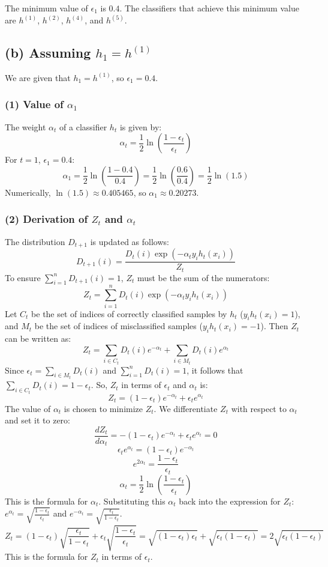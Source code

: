 The minimum value of $\epsilon_1$ is $0.4$.
The classifiers that achieve this minimum value are $h^{(1)}$, $h^{(2)}$, $h^{(4)}$, and $h^{(5)}$.

\subsection*{(b) Assuming $h_1 = h^{(1)}$}
We are given that $h_1 = h^{(1)}$, so $\epsilon_1 = 0.4$.

\subsubsection*{(1) Value of $\alpha_1$}
The weight $\alpha_t$ of a classifier $h_t$ is given by:
$$ \alpha_t = \frac{1}{2} \ln\left(\frac{1-\epsilon_t}{\epsilon_t}\right) $$
For $t=1$, $\epsilon_1 = 0.4$:
$$ \alpha_1 = \frac{1}{2} \ln\left(\frac{1-0.4}{0.4}\right) = \frac{1}{2} \ln\left(\frac{0.6}{0.4}\right) = \frac{1}{2} \ln(1.5) $$
Numerically, $\ln(1.5) \approx 0.405465$, so $\alpha_1 \approx 0.20273$.

\subsubsection*{(2) Derivation of $Z_t$ and $\alpha_t$}
The distribution $D_{t+1}$ is updated as follows:
$$ D_{t+1}(i) = \frac{D_t(i) \exp(-\alpha_t y_i h_t(x_i))}{Z_t} $$
To ensure $\sum_{i=1}^{n} D_{t+1}(i) = 1$, $Z_t$ must be the sum of the numerators:
$$ Z_t = \sum_{i=1}^{n} D_t(i) \exp(-\alpha_t y_i h_t(x_i)) $$
Let $C_t$ be the set of indices of correctly classified samples by $h_t$ ($y_i h_t(x_i)=1$), and $M_t$ be the set of indices of misclassified samples ($y_i h_t(x_i)=-1$).
Then $Z_t$ can be written as:
$$ Z_t = \sum_{i \in C_t} D_t(i) e^{-\alpha_t} + \sum_{i \in M_t} D_t(i) e^{\alpha_t} $$
Since $\epsilon_t = \sum_{i \in M_t} D_t(i)$ and $\sum_{i=1}^n D_t(i) = 1$, it follows that $\sum_{i \in C_t} D_t(i) = 1 - \epsilon_t$.
So, $Z_t$ in terms of $\epsilon_t$ and $\alpha_t$ is:
$$ Z_t = (1-\epsilon_t)e^{-\alpha_t} + \epsilon_t e^{\alpha_t} $$
The value of $\alpha_t$ is chosen to minimize $Z_t$. We differentiate $Z_t$ with respect to $\alpha_t$ and set it to zero:
$$ \frac{dZ_t}{d\alpha_t} = -(1-\epsilon_t)e^{-\alpha_t} + \epsilon_t e^{\alpha_t} = 0 $$
$$ \epsilon_t e^{\alpha_t} = (1-\epsilon_t)e^{-\alpha_t} $$
$$ e^{2\alpha_t} = \frac{1-\epsilon_t}{\epsilon_t} $$
$$ \alpha_t = \frac{1}{2} \ln\left(\frac{1-\epsilon_t}{\epsilon_t}\right) $$
This is the formula for $\alpha_t$. Substituting this $\alpha_t$ back into the expression for $Z_t$:
$e^{\alpha_t} = \sqrt{\frac{1-\epsilon_t}{\epsilon_t}}$ and $e^{-\alpha_t} = \sqrt{\frac{\epsilon_t}{1-\epsilon_t}}$.
$$ Z_t = (1-\epsilon_t)\sqrt{\frac{\epsilon_t}{1-\epsilon_t}} + \epsilon_t\sqrt{\frac{1-\epsilon_t}{\epsilon_t}} = \sqrt{(1-\epsilon_t)\epsilon_t} + \sqrt{\epsilon_t(1-\epsilon_t)} = 2\sqrt{\epsilon_t(1-\epsilon_t)} $$
This is the formula for $Z_t$ in terms of $\epsilon_t$.

